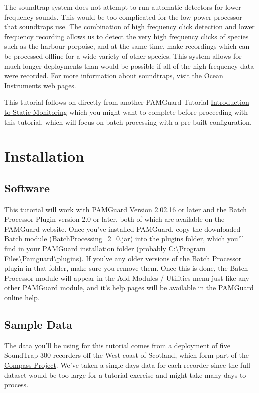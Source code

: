 \documentclass[
]{article}
\begin{document}
The soundtrap system does not attempt to run automatic detectors for
lower frequency sounds. This would be too complicated for the low power
processor that soundtraps use. The combination of high frequency click
detection and lower frequency recording allows us to detect the very
high frequency clicks of species such as the harbour porpoise, and at
the same time, make recordings which can be processed offline for a wide
variety of other species. This system allows for much longer deployments
than would be possible if all of the high frequency data were recorded.
For more information about soundtraps, visit the
\href{https://www.oceaninstruments.co.nz/}{Ocean Instruments} web pages.

This tutorial follows on directly from another PAMGuard Tutorial
\href{https://www.pamguard.org/tutorials/staticmonitoring.html}{Introduction
to Static Monitoring} which you might want to complete before proceeding
with this tutorial, which will focus on batch processing with a
pre-built configuration.

\section{Installation}\label{installation}

\subsection{Software}\label{software}

This tutorial will work with PAMGuard Version 2.02.16 or later and the
Batch Processor Plugin version 2.0 or later, both of which are available
on the PAMGuard website. Once you've installed PAMGuard, copy the
downloaded Batch module (BatchProcessing\_2\_0.jar) into the plugins
folder, which you'll find in your PAMGuard installation folder (probably
C:\textbackslash Program
Files\textbackslash Pamguard\textbackslash plugins). If you've any older
versions of the Batch Processor plugin in that folder, make sure you
remove them. Once this is done, the Batch Processor module will appear
in the Add Modules / Utilities menu just like any other PAMGuard module,
and it's help pages will be available in the PAMGuard online help.

\subsection{Sample Data}\label{sample-data}

The data you'll be using for this tutorial comes from a deployment of
five SoundTrap 300 recorders off the West coast of Scotland, which form
part of the
\href{https://www.sams.ac.uk/science/projects/compass/}{Compass
Project}. We've taken a single days data for each recorder since the
full dataset would be too large for a tutorial exercise and might take
many days to process.
\end{document}
